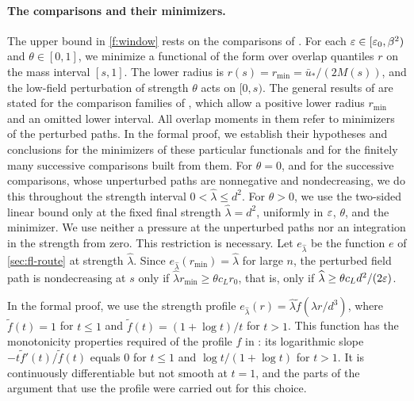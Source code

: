 \paragraph{The comparisons and their minimizers.} The upper bound in \cref{f:window} rests on the comparisons of \cite[Section~7.3]{oai-fluctuations}. For each $\varepsilon\in[\varepsilon_0,\beta^2)$ and $\theta\in[0,1]$, we minimize a functional of the form \cite[(6)]{oai-fluctuations} over overlap quantiles $r$ on the mass interval $[s,1]$. The lower radius is $r(s)=r_{\min}={\bar u}_*/(2M(s))$, and the low-field perturbation of strength $\theta$ acts on $[0,s)$. The general results of \cite{oai-fluctuations} are stated for the comparison families of \cite[Definition~6.1]{oai-fluctuations}, which allow a positive lower radius $r_{\min}$ and an omitted lower interval. All overlap moments in them refer to minimizers of the perturbed paths. In the formal proof, we establish their hypotheses and conclusions for the minimizers of these particular functionals and for the finitely many successive comparisons built from them. For $\theta=0$, and for the successive comparisons, whose unperturbed paths are nonnegative and nondecreasing, we do this throughout the strength interval $0<{\widehat\lambda}\le d^2$. For $\theta>0$, we use the two-sided linear bound only at the fixed final strength ${\widehat\lambda}=d^2$, uniformly in $\varepsilon$, $\theta$, and the minimizer. We use neither a pressure at the unperturbed paths nor an integration in the strength from zero. This restriction is necessary. Let $e_{\widehat\lambda}$ be the function $e$ of \cref{sec:fl-route} at strength ${\widehat\lambda}$. Since $e_{\widehat\lambda}(r_{\min})={\widehat\lambda}$ for large $n$, the perturbed field path is nondecreasing at $s$ only if ${\widehat\lambda} r_{\min}\ge\theta c_Lr_0$, that is, only if ${\widehat\lambda}\ge\theta c_Ld^2/(2\varepsilon)$.

In the formal proof, we use the strength profile $e_{\widehat\lambda}(r)={\widehat\lambda}\tilde f({\widehat\lambda} r/d^3)$, where $\tilde f(t)=1$ for $t\le1$ and $\tilde f(t)=(1+\log t)/t$ for $t>1$. This function has the monotonicity properties required of the profile $f$ in \cite[(6)]{oai-fluctuations}: its logarithmic slope $-t\tilde f'(t)/\tilde f(t)$ equals $0$ for $t\le1$ and $\log t/(1+\log t)$ for $t>1$. It is continuously differentiable but not smooth at $t=1$, and the parts of the argument that use the profile were carried out for this choice.

